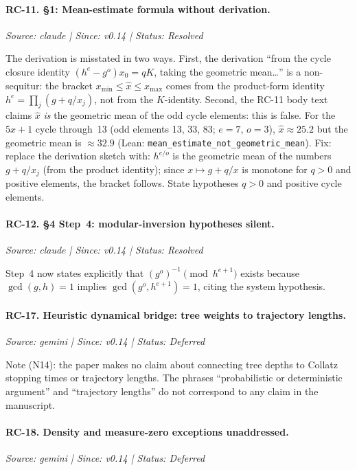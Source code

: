 \documentclass[12pt]{article}
\theoremstyle{definition}
\theoremstyle{remark}
\theoremstyle{plain}
\begin{document}
\paragraph{RC-11. \S1: Mean-estimate formula without derivation.}
\textit{Source: claude | Since: v0.14 | Status: Resolved}

The derivation is misstated in two ways.  First, the derivation ``from the cycle
closure identity $(h^e - g^o)x_0 = qK$, taking the geometric mean\ldots'' is a
non-sequitur: the bracket $x_{\min} \le \hat{x} \le x_{\max}$ comes from the
product-form identity $h^e = \prod_j (g + q/x_j)$, not from the $K$-identity.
Second, the RC-11 body text claims $\hat{x}$ \emph{is} the geometric mean of the
odd cycle elements: this is false.  For the $5x+1$ cycle through~13 (odd
elements 13, 33, 83; $e = 7$, $o = 3$), $\hat{x} \approx 25.2$ but the
geometric mean is $\approx 32.9$ (Lean: \texttt{mean\_estimate\_not\_geometric\_mean}).
Fix: replace the derivation sketch with: $h^{e/o}$ is the geometric mean of
the numbers $g + q/x_j$ (from the product identity); since $x \mapsto g + q/x$
is monotone for $q > 0$ and positive elements, the bracket follows.  State
hypotheses $q > 0$ and positive cycle elements.

\paragraph{RC-12. \S4 Step~4: modular-inversion hypotheses silent.}
\textit{Source: claude | Since: v0.14 | Status: Resolved}

Step~4 now states explicitly that $(g^o)^{-1} \pmod{h^{e+1}}$ exists because
$\gcd(g,h)=1$ implies $\gcd(g^o, h^{e+1})=1$, citing the system hypothesis.

\paragraph{RC-17. Heuristic dynamical bridge: tree weights to trajectory lengths.}
\textit{Source: gemini | Since: v0.14 | Status: Deferred}

Note (N14): the paper makes no claim about connecting tree depths to
Collatz stopping times or trajectory lengths.  The phrases ``probabilistic or
deterministic argument'' and ``trajectory lengths'' do not correspond to any
claim in the manuscript.

\paragraph{RC-18. Density and measure-zero exceptions unaddressed.}
\textit{Source: gemini | Since: v0.14 | Status: Deferred}
\end{document}
